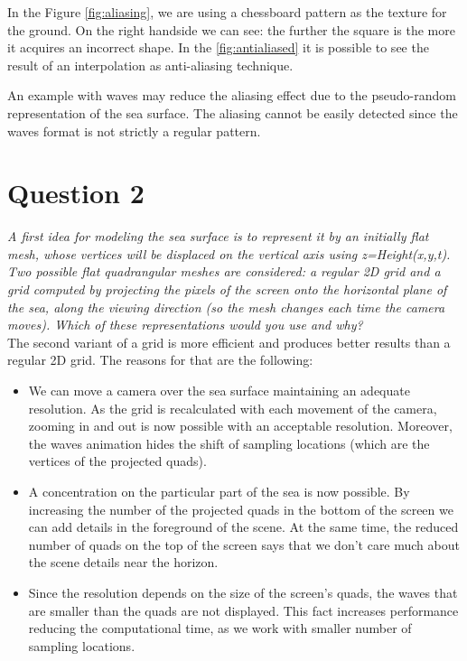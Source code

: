 \documentclass{report}
\begin{document}
In the Figure \ref{fig:aliasing}, we are using a chessboard pattern as the texture for the ground. On the right handside we can see: the further the square is the more it acquires an incorrect shape. In the \ref{fig:antialiased} it is possible to see the result of an interpolation as anti-aliasing technique.	

An example with waves may reduce the aliasing effect due to the pseudo-random representation of the sea surface. The aliasing cannot be easily detected since the waves format is not strictly a regular pattern.


\section{Question 2}

\emph{A first idea for modeling the sea surface is to represent it by an
initially flat mesh, whose vertices will be displaced on the vertical
axis using z=Height(x,y,t). Two possible flat quadrangular meshes are
considered: a regular 2D grid and a grid computed by projecting the
pixels of the screen onto the horizontal plane of the sea, along the
viewing direction (so the mesh changes each time the camera moves).
Which of these representations would you use and why?}\\

The second variant of a grid is more efficient and produces better
results than a regular 2D grid. The reasons for that are the following\cite{iaow}:

\begin{itemize}

  \item We can move a camera over the sea surface maintaining an
    adequate resolution. As the grid is recalculated with each movement of
    the camera, zooming in and out is now possible with an acceptable
    resolution. Moreover, the waves animation hides the shift of sampling
    locations (which are the vertices of the projected quads).

  \item A concentration on the particular part of the sea is now
    possible. By increasing the number of the projected quads in
    the bottom of the screen we can add details in the foreground of the
    scene. At the same time, the reduced number of quads on the top of
    the screen says that we don't care much about the scene details
    near the horizon.

  \item Since the resolution depends on the size of the screen's quads,
    the waves that are smaller than the quads are not displayed. This
    fact increases performance reducing the computational time, as we
    work with smaller number of sampling locations.

\end{itemize}
\end{document}

